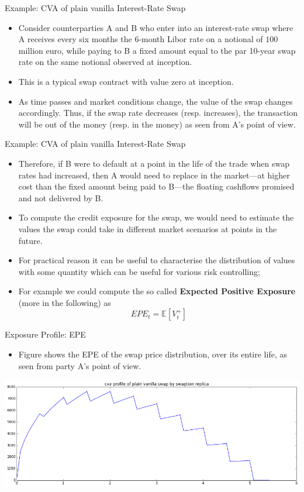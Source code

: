 \documentclass[11pt]{beamer}
\begin{document}
\begin{frame}{Example: CVA of plain vanilla Interest-Rate Swap}
\begin{itemize}
\item Consider counterparties A and B who enter into an interest-rate swap where A receives
every six months the 6-month Libor rate on a notional of $100$ million euro, while
paying to B a fixed amount equal to the par 10-year swap rate on the same notional
observed at inception.
\item This is a typical swap contract with value zero at inception. 
\item As time passes and
market conditions change, the value of the swap changes accordingly. Thus, if the swap rate decreases (resp. increases), the transaction will be out of the money (resp.
in the money) as seen from A’s point of view. 
\end{itemize}
\end{frame}
\begin{frame}{Example: CVA of plain vanilla Interest-Rate Swap}
\begin{itemize}
\item Therefore, if B were to default at a
point in the life of the trade when swap rates had increased, then A would need to
replace in the market—at higher cost than the fixed amount being paid to B—the
floating cashflows promised and not delivered by B.
\item To compute the credit exposure for the swap, we would need to estimate the
values the swap could take in different market scenarios at points in the future.
\item For practical reason it can be useful to characterise the distribution of values with some quantity which can be useful for various risk controlling;
\item For example we could compute the so called \textbf{Expected Positive Exposure} (more in the following) as
$$ EPE_t = \mathbb{E}[V_t^+]$$
\end{itemize}
\end{frame}
\begin{frame}{Exposure Profile: EPE}
\begin{itemize}
\item Figure shows the  EPE of the swap price
distribution, over its entire life, as seen from party A’s point of view. 
\end{itemize}
\begin{center}
\includegraphics[scale=.4]{img/profile_1.png} 
\end{center}
\end{frame}
\end{document}
